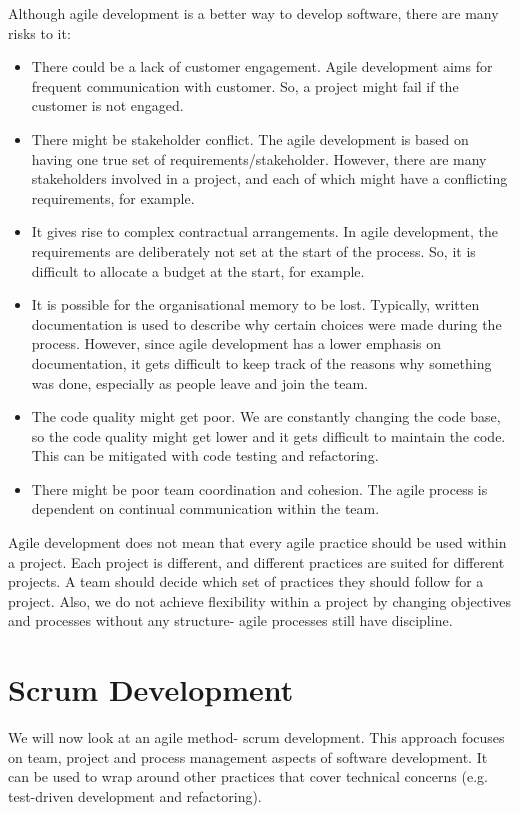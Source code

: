 \documentclass[a4paper, openany]{memoir}
\begin{document}
Although agile development is a better way to develop software, there are many risks to it:
\begin{itemize}
    \item There could be a lack of customer engagement. Agile development aims for frequent communication with customer. So, a project might fail if the customer is not engaged.
    
    \item There might be stakeholder conflict. The agile development is based on having one true set of requirements/stakeholder. However, there are many stakeholders involved in a project, and each of which might have a conflicting requirements, for example.
    
    \item It gives rise to complex contractual arrangements. In agile development, the requirements are deliberately not set at the start of the process. So, it is difficult to allocate a budget at the start, for example.
    
    \item It is possible for the organisational memory to be lost. Typically, written documentation is used to describe why certain choices were made during the process. However, since agile development has a lower emphasis on documentation, it gets difficult to keep track of the reasons why something was done, especially as people leave and join the team.
    
    \item The code quality might get poor. We are constantly changing the code base, so the code quality might get lower and it gets difficult to maintain the code. This can be mitigated with code testing and refactoring.
    
    \item There might be poor team coordination and cohesion. The agile process is dependent on continual communication within the team.
\end{itemize}

Agile development does not mean that every agile practice should be used within a project. Each project is different, and different practices are suited for different projects. A team should decide which set of practices they should follow for a project. Also, we do not achieve flexibility within a project by changing objectives and processes without any structure- agile processes still have discipline.

\section{Scrum Development}
We will now look at an agile method- scrum development. This approach focuses on team, project and process management aspects of software development. It can be used to wrap around other practices that cover technical concerns (e.g. test-driven development and refactoring). 
\end{document}
